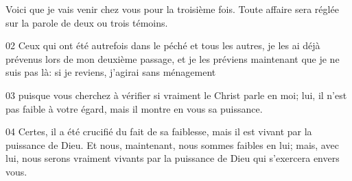 Voici que je vais venir chez vous pour la troisième fois. Toute affaire sera réglée sur la parole de deux ou trois témoins.

02 Ceux qui ont été autrefois dans le péché et tous les autres, je les ai déjà prévenus lors de mon deuxième passage, et je les préviens maintenant que je ne suis pas là: si je reviens, j’agirai sans ménagement

03 puisque vous cherchez à vérifier si vraiment le Christ parle en moi; lui, il n’est pas faible à votre égard, mais il montre en vous sa puissance.

04 Certes, il a été crucifié du fait de sa faiblesse, mais il est vivant par la puissance de Dieu. Et nous, maintenant, nous sommes faibles en lui; mais, avec lui, nous serons vraiment vivants par la puissance de Dieu qui s’exercera envers vous.
